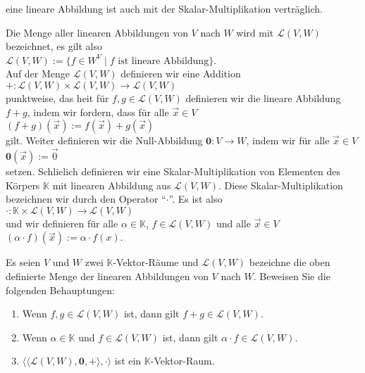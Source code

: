 \begin{Definition}[$\mathcal{L}(V, W)$]
\begin{enumerate}
      eine lineare Abbildung ist auch mit der Skalar-Multiplikation vertr\"{a}glich.
\end{enumerate}
Die Menge aller linearen Abbildungen von $V$ nach $W$ wird mit $\mathcal{L}(V, W)$ bezeichnet, es
gilt also
\\[0.2cm]
\hspace*{1.3cm}
$\mathcal{L}(V, W) := \{ f \in W^V \mid \mbox{$f$ ist lineare Abbildung} \}$.
\\[0.2cm]
Auf der Menge $\mathcal{L}(V, W)$ definieren wir eine Addition
\\[0.2cm]
\hspace*{1.3cm}
$+: \mathcal{L}(V, W) \times \mathcal{L}(V, W) \rightarrow \mathcal{L}(V, W)$
\\[0.2cm]
punktweise, das hei\3t f\"{u}r $f,g \in \mathcal{L}(V, W)$ definieren wir die lineare Abbildung $f+g$,
indem wir fordern, dass f\"{u}r alle $\vec{x} \in V$
\\[0.2cm]
\hspace*{1.3cm}
$(f+g)(\vec{x}) := f(\vec{x}) + g(\vec{x})$ 
\\[0.2cm]
gilt.  Weiter definieren wir die Null-Abbildung $\mathbf{0}: V \rightarrow W$, indem wir f\"{u}r alle
$\vec{x} \in V$
\\[0.2cm]
\hspace*{1.3cm}
$\mathbf{0}(\vec{x}) := \vec{0}$
\\[0.2cm]
setzen.  Schlie\3lich definieren wir eine Skalar-Multiplikation von Elementen des K\"{o}rpers
$\mathbb{K}$ mit linearen Abbildung aus $\mathcal{L}(V,W)$.  Diese Skalar-Multiplikation bezeichnen
wir durch den Operator ``$\cdot$''.  Es ist also
\\[0.2cm]
\hspace*{1.3cm}
$\cdot: \mathbb{K} \times \mathcal{L}(V, W) \rightarrow \mathcal{L}(V, W)$
\\[0.2cm]
und wir definieren f\"{u}r alle $\alpha \in \mathbb{K}$, $f \in \mathcal{L}(V, W)$ und alle $\vec{x} \in V$
\\[0.2cm]
\hspace*{1.3cm}
$(\alpha \cdot f)(\vec{x}) := \alpha \cdot f(x)$.
 \eoxs
\end{Definition}

\exercise
Es seien $V$ und $W$ zwei $\mathbb{K}$-Vektor-R\"{a}ume und $\mathcal{L}(V, W)$ bezeichne die oben
definierte Menge der linearen Abbildungen von $V$ nach $W$.  Beweisen Sie die folgenden Behauptungen:
\begin{enumerate}
\item Wenn $f,g \in \mathcal{L}(V,W)$ ist,  dann gilt $f+g \in \mathcal{L}(V, W)$.
\item Wenn $\alpha \in \mathbb{K}$ und $f \in \mathcal{L}(V,W)$ ist,  dann gilt  $\alpha \cdot f \in \mathcal{L}(V, W)$.
\item $\bigl\langle \langle \mathcal{L}(V, W), \mathbf{0}, + \rangle, \cdot \rangle$ ist ein $\mathbb{K}$-Vektor-Raum.
      \eoxs
\end{enumerate}

